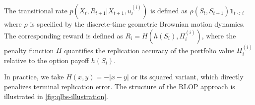\begin{defn}
The transitional rate
$p(X_t,R_{t+1}|X_{t+1},u_{t}^{\left(i\right)})$
is defined as 
$\rho\left(S_{t},S_{t+1}\right) \boldsymbol{1}_{t<i}$
where $\rho$ is specified by the discrete-time geometric Brownian motion dynamics.
The corresponding reward is defined as $R_i = H\left(h(S_i), \Pi_i^{(i)}\right)$, where the penalty function $H$ quantifies the replication accuracy of the portfolio value $\Pi_i^{(i)}$ relative to the option payoff $h(S_i)$.
\end{defn}

In practice, we take $H(x,y)=-|x-y|$ or its squared variant, which directly penalizes terminal replication error.
The structure of the RLOP approach is illustrated in \cref{fig:qlbs-illustration}.
